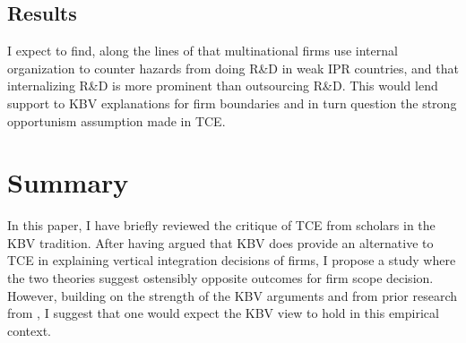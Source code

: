 \documentclass[12pt,letterpaper]{article}
\begin{document}
\subsection{Results}
I expect to find, along the lines of \cite{Zhao2006} that multinational firms use internal organization to counter hazards from doing R\&D in weak IPR countries, and that internalizing R\&D is more prominent than outsourcing R\&D. This would lend support to KBV explanations for firm boundaries and in turn question the strong opportunism assumption made in TCE.

\section{Summary}
In this paper, I have briefly reviewed the critique of TCE from scholars in the KBV tradition. After having argued that KBV does provide an alternative to TCE in explaining vertical integration decisions of firms, I propose a study where the two theories suggest ostensibly opposite outcomes for firm scope decision. However, building on the strength of the KBV arguments and from prior research from \cite{Zhao2006}, I suggest that one would expect the KBV view to hold in this empirical context.


\begin{singlespace}
\renewcommand{\refname}{REFERENCES}
 

\end{singlespace}
\end{document}
